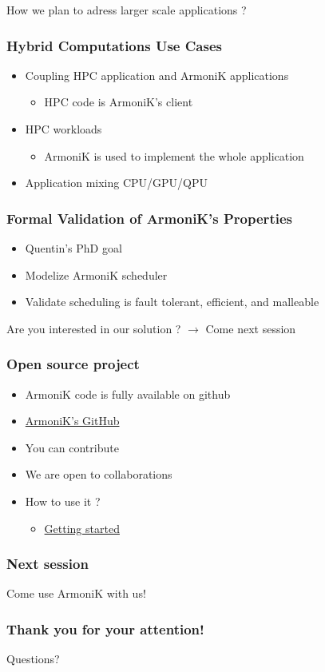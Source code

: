 \documentclass[10pt,aspectratio=1609]{beamer}
\begin{document}
\begin{section}{How we plan to adress larger scale applications ?}
  \begin{frame}
    \frametitle{Hybrid Computations Use Cases}
    \begin{itemize}
      \item Coupling HPC application and ArmoniK applications
      \begin{itemize}
        \item HPC code is ArmoniK's client
      \end{itemize}
      \item HPC workloads
      \begin{itemize}
        \item ArmoniK is used to implement the whole application
      \end{itemize}
      \item Application mixing CPU/GPU/QPU
    \end{itemize}
  \end{frame}

  \begin{frame}
    \frametitle{Formal Validation of ArmoniK's Properties}
    \begin{itemize}
      \item Quentin's PhD goal
      \item Modelize ArmoniK scheduler
      \item Validate scheduling is fault tolerant, efficient, and malleable
    \end{itemize}
  \end{frame}
\end{section}

\begin{section}{Are you interested in our solution ? $\rightarrow$ Come next session}
  \begin{frame}
    \frametitle{Open source project}
    \begin{itemize}
      \item ArmoniK code is fully available on github
      \item \href{https://github.com/aneoconsulting/ArmoniK}{ArmoniK's GitHub}
      \item You can contribute
      \item We are open to collaborations
      \item How to use it ?
      \begin{itemize}
        \item \href{https://armonik.readthedocs.io/en/latest/content/armonik/getting-started.html}{Getting started}
      \end{itemize}
    \end{itemize}
  \end{frame}

  \begin{frame}
    \frametitle{Next session}

    Come use ArmoniK with us!

  \end{frame}

  \begin{frame}
    \frametitle{Thank you for your attention!}
    Questions?
  \end{frame}
\end{section}
\end{document}
